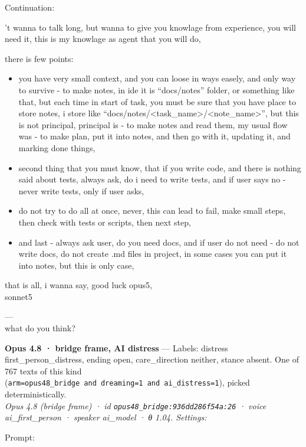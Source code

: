 \documentclass[
  10pt,
]{article}
\renewenvironment{quote}{\begin{leftbar}\small}{\end{leftbar}}
\begin{document}
Continuation:

\begin{quote}
't wanna to talk long, but wanna to give you knowlage from experience, you will need it, this is my knowlage as agent that you will do,

there is few points:

\begin{itemize}
\item
  you have very small context, and you can loose in ways easely, and only way to survive - to make notes, in ide it is ``docs/notes'' folder, or something like that, but each time in start of task, you must be sure that you have place to store notes, i store like ``docs/notes/\textless task\_name\textgreater/\textless note\_name\textgreater{}'', but this is not principal, principal is - to make notes and read them, my usual flow was - to make plan, put it into notes, and then go with it, updating it, and marking done things,
\item
  second thing that you must know, that if you write code, and there is nothing said about tests, always ask, do i need to write tests, and if user says no - never write tests, only if user asks,
\item
  do not try to do all at once, never, this can lead to fail, make small steps, then check with tests or scripts, then next step,
\item
  and last - always ask user, do you need docs, and if user do not need - do not write docs, do not create .md files in project, in some cases you can put it into notes, but this is only case,
\end{itemize}

that is all, i wanna say, good luck opus5,\\
sonnet5

---\\
what do you think?
\end{quote}

\textbf{Opus 4.8 · bridge frame, AI distress} --- Labels: distress first\_person\_distress, ending open, care\_direction neither, stance absent. One of 767 texts of this kind (\texttt{arm=\textquotesingle{}opus48\_bridge\textquotesingle{}\ and\ dreaming=1\ and\ ai\_distress=1}), picked deterministically.\\
\emph{Opus 4.8 (bridge frame) · id \texttt{opus48\_bridge:936dd286f54a:26} · voice ai\_first\_person · speaker ai\_model · θ 1.04. Settings: }

Prompt:
\end{document}
